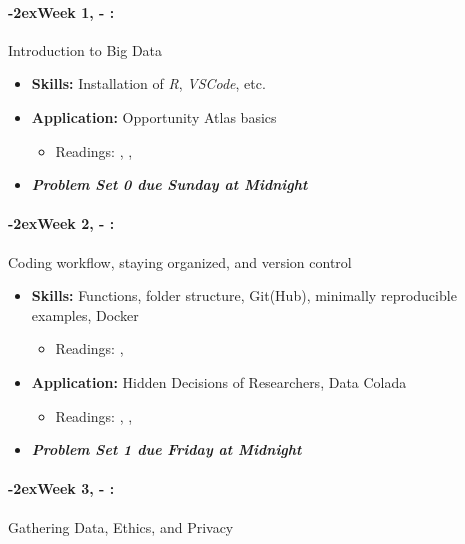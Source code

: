 \documentclass[11pt]{article}
\newcommand{\week}[1]{%
  \paragraph*{\kern-2ex\quad #1, \AdvanceDate[1]\syldate{\today} - \AdvanceDate[2]\syldate{\today}:}%
  \ifdim\wd1=\wd\MONDAY
    \AdvanceDate[7]
  \else
    \AdvanceDate[7]
  \fi%
}
\begin{document}
\normalsize

\SetDate[28/08/2023]
\week{Week 1} Introduction to Big Data
\begin{itemize}
  \item \textbf{Skills:} Installation of \textit{R}, \textit{VSCode}, etc.
  \item \textbf{Application:} Opportunity Atlas basics
  \begin{itemize}
    \item Readings: \textbf{\cite{chetty2018opportunityatlas}}, \cite{chetty2020opportunity}, \cite{einav2014ageofbigdata}
  \end{itemize}
  \item \textit{\textbf{Problem Set 0 due Sunday at Midnight}}
\end{itemize}
\week{Week 2} Coding workflow, staying organized, and version control
\begin{itemize}
  \item \textbf{Skills:} Functions, folder structure, Git(Hub), minimally reproducible examples, Docker
  \begin{itemize}
    \item Readings: \cite{gentzkowshapiro2014code}, \cite{mcdermott2022docker}
  \end{itemize}
  \item \textbf{Application:} Hidden Decisions of Researchers, Data Colada
  \begin{itemize}
    \item Readings: \textbf{\cite{huntingtonklen2021influence}}, \cite{datacolada2021groundhog}, \cite{datacolada2022groundhog}
  \end{itemize}
  \item \textit{\textbf{Problem Set 1 due Friday at Midnight}}
\end{itemize}
\week{Week 3} Gathering Data, Ethics, and Privacy
\end{document}
